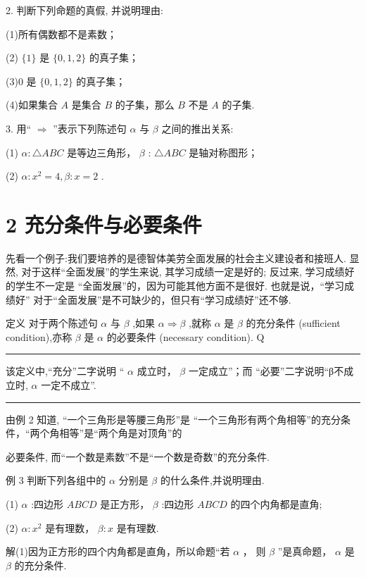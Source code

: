 \documentclass[10pt]{article}
\newcommand{\HRule}{\begin{center}\rule{0.9\linewidth}{0.2mm}\end{center}}
\begin{document}
2. 判断下列命题的真假, 并说明理由:

(1)所有偶数都不是素数；

(2) \(\{ 1\}\) 是 \(\{ 0,1,2\}\) 的真子集；

(3)0 是 \(\{ 0,1,2\}\) 的真子集；

(4)如果集合 \(A\) 是集合 \(B\) 的子集，那么 \(B\) 不是 \(A\) 的子集.

3. 用“ \(\Rightarrow\) ”表示下列陈述句 \(\alpha\) 与 \(\beta\) 之间的推出关系:

(1) \(\alpha  : {\bigtriangleup {ABC}}\) 是等边三角形， \(\beta\) : \({\bigtriangleup {ABC}}\) 是轴对称图形；

(2) \(\alpha  : {x}^{2} = 4,\beta  : x = 2\) .

\section*{2 充分条件与必要条件}

先看一个例子:我们要培养的是德智体美劳全面发展的社会主义建设者和接班人. 显然, 对于这样“全面发展”的学生来说, 其学习成绩一定是好的; 反过来, 学习成绩好的学生不一定是 “全面发展”的，因为可能其他方面不是很好. 也就是说，“学习成绩好” 对于“全面发展”是不可缺少的，但只有“学习成绩好”还不够.

定义 对于两个陈述句 \(\alpha\) 与 \(\beta\) ,如果 \(\alpha  \Rightarrow  \beta\) ,就称 \(\alpha\) 是 \(\beta\) 的充分条件 (sufficient condition),亦称 \(\beta\) 是 \(\alpha\) 的必要条件 (necessary condition). Q

\HRule

该定义中,“充分”二字说明 “ \(\alpha\) 成立时， \(\beta\) 一定成立”；而 “必要”二字说明“β不成立时, \(\alpha\) 一定不成立”.

\HRule

由例 2 知道, “一个三角形是等腰三角形”是 “一个三角形有两个角相等”的充分条件，“两个角相等”是“两个角是对顶角”的



必要条件, 而“一个数是素数”不是“一个数是奇数”的充分条件.

例 3 判断下列各组中的 \(\alpha\) 分别是 \(\beta\) 的什么条件,并说明理由.

(1) \(\alpha\) :四边形 \({ABCD}\) 是正方形， \(\beta\) :四边形 \({ABCD}\) 的四个内角都是直角;

(2) \(\alpha  : {x}^{2}\) 是有理数， \(\beta  : x\) 是有理数.

解(1)因为正方形的四个内角都是直角，所以命题“若 \(\alpha\) ， 则 \(\beta\) ”是真命题， \(\alpha\) 是 \(\beta\) 的充分条件.
\end{document}
